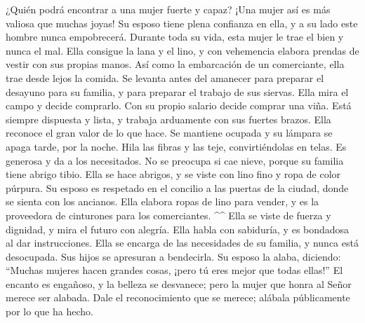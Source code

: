  ¿Quién podrá encontrar a una mujer fuerte y capaz? ¡Una
mujer así es más valiosa que muchas joyas!  Su esposo tiene
plena confianza en ella, y a su lado este hombre nunca empobrecerá.
 Durante toda su vida, esta mujer le trae el bien y nunca
el mal.  Ella consigue la lana y el lino, y con vehemencia
elabora prendas de vestir con sus propias manos.  Así como
la embarcación de un comerciante, ella trae desde lejos la comida.
 Se levanta antes del amanecer para preparar el desayuno
para su familia, y para preparar el trabajo de sus siervas.
 Ella mira el campo y decide comprarlo. Con su propio
salario decide comprar una viña.  Está siempre dispuesta y
lista, y trabaja arduamente con sus fuertes brazos.  Ella
reconoce el gran valor de lo que hace. Se mantiene ocupada y su lámpara
se apaga tarde, por la noche.  Hila las fibras y las teje,
convirtiéndolas en telas.  Es generosa y da a los
necesitados.  No se preocupa si cae nieve, porque su
familia tiene abrigo tibio.  Ella se hace abrigos, y se
viste con lino fino y ropa de color púrpura.  Su esposo es
respetado en el concilio a las puertas de la ciudad, donde se sienta con
los ancianos.  Ella elabora ropas de lino para vender, y es
la proveedora de cinturones para los comerciantes. \^{}\^{}
 Ella se viste de fuerza y dignidad, y mira el futuro con
alegría.  Ella habla con sabiduría, y es bondadosa al dar
instrucciones.  Ella se encarga de las necesidades de su
familia, y nunca está desocupada.  Sus hijos se apresuran a
bendecirla. Su esposo la alaba, diciendo:  ``Muchas mujeres
hacen grandes cosas, ¡pero tú eres mejor que todas ellas!''
 El encanto es engañoso, y la belleza se desvanece; pero la
mujer que honra al Señor merece ser alabada.  Dale el
reconocimiento que se merece; alábala públicamente por lo que ha hecho.
